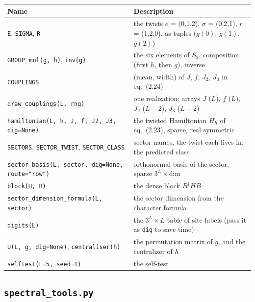 \documentclass[11pt,a4paper]{article}
\newcommand{\code}[1]{\texttt{\textcolor{codeink}{#1}}}
\begin{document}
\begingroup\small
\begin{tabularx}{\linewidth}{L{6.4cm}Y}
\toprule{}\textbf{Name} & \textbf{Description}\\\midrule
\code{E}, \code{SIGMA}, \code{R} & the twists $e$ = (0,1,2), $\sigma$ = (0,2,1), $r$ = (1,2,0), as tuples
  ($g(0)$, $g(1)$, $g(2)$)\\
\code{GROUP}, \code{mul(g, h)}, \code{inv(g)} & the six elements of $S_3$, composition (first $h$, then $g$), inverse\\
\code{COUPLINGS} & (mean, width) of $J$, $f$, $J_2$, $J_3$ in eq.~(2.24)\\
\code{draw\_couplings(L, rng)} & one realization: arrays $J$ ($L$), $f$ ($L$), $J_2$ ($L-2$), $J_3$ ($L-2$)\\
\code{hamiltonian(L, h, J, f, J2, J3, dig=None)} & the twisted Hamiltonian $H_h$ of eq.~(2.23), sparse, real symmetric\\
\code{SECTORS}, \code{SECTOR\_TWIST}, \code{SECTOR\_CLASS} & sector names, the twist each lives in, the predicted class\\
\code{sector\_basis(L, sector, dig=None, route="row")} & orthonormal basis of the sector, sparse $3^L\times\mathrm{dim}$\\
\code{block(H, B)} & the dense block $B^\dagger H B$\\
\code{sector\_dimension\_formula(L, sector)} & the sector dimension from the character formula\\
\code{digits(L)} & the $3^L\times L$ table of site labels (pass it as \code{dig} to save time)\\
\code{U(L, g, dig=None)}, \code{centraliser(h)} & the permutation matrix of $g$, and the centralizer of $h$\\
\code{selftest(L=5, seed=1)} & the self-test\\
\bottomrule
\end{tabularx}\par
\endgroup

\subsection{\texttt{spectral\_tools.py}}
\end{document}
